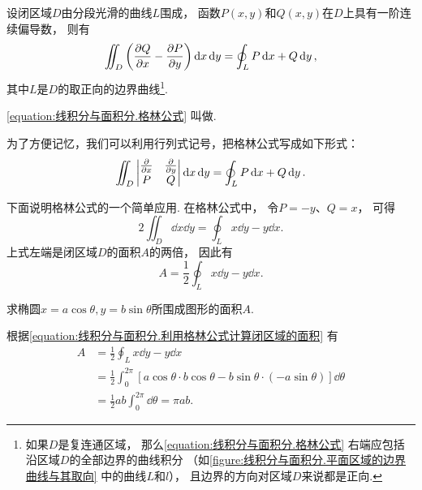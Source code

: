 \begin{theorem}[格林公式]
设闭区域\(D\)由分段光滑的曲线\(L\)围成，
函数\(P(x,y)\)和\(Q(x,y)\)在\(D\)上具有一阶连续偏导数，
则有
\begin{equation}\label{equation:线积分与面积分.格林公式}
	\iint_D \left( \pdv{Q}{x} - \pdv{P}{y} \right) \dd{x}\dd{y}
	= \oint_L P\dd{x} + Q\dd{y},
\end{equation}
其中\(L\)是\(D\)的取正向的边界曲线\footnote{%
如果\(D\)是复连通区域，
那么\cref{equation:线积分与面积分.格林公式}
右端应包括沿区域\(D\)的全部边界的曲线积分
（如\cref{figure:线积分与面积分.平面区域的边界曲线与其取向} 中的曲线\(L\)和\(l\)），
且边界的方向对区域\(D\)来说都是正向.}.
\end{theorem}
\cref{equation:线积分与面积分.格林公式} 叫做.

为了方便记忆，我们可以利用行列式记号，把格林公式写成如下形式：\[
	\iint_D \begin{vmatrix}
		\pdv{x} & \pdv{y} \\
		P & Q
	\end{vmatrix} \dd{x}\dd{y}
	= \oint_L P\dd{x}+Q\dd{y}.
\]

下面说明格林公式的一个简单应用.
在格林公式中，
令\(P=-y\)、\(Q=x\)，
可得\[
	2 \iint_D \dd{x}\dd{y}
	=\oint_L x\dd{y}-y\dd{x}.
\]
上式左端是闭区域\(D\)的面积\(A\)的两倍，
因此有
\begin{equation}\label{equation:线积分与面积分.利用格林公式计算闭区域的面积}
	A = \frac{1}{2} \oint_L x\dd{y}-y\dd{x}.
\end{equation}

\begin{example}
求椭圆\(x = a \cos\theta, y = b \sin\theta\)所围成图形的面积\(A\).
\begin{solution}
根据\cref{equation:线积分与面积分.利用格林公式计算闭区域的面积} 有
\begin{align*}
	A &= \frac{1}{2} \oint_L x\dd{y}-y\dd{x} \\
	&= \frac{1}{2} \int_0^{2\pi}
		\left[
			a \cos\theta \cdot b \cos\theta
			- b \sin\theta \cdot (-a \sin\theta)
		\right] \dd{\theta} \\
	&= \frac{1}{2} ab \int_0^{2\pi} \dd{\theta}
	= \pi ab.
\end{align*}
\end{solution}
\end{example}

